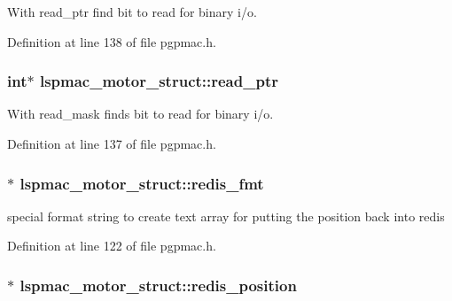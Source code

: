 With read\-\_\-ptr find bit to read for binary i/o. 



Definition at line 138 of file pgpmac.\-h.

\hypertarget{structlspmac__motor__struct_a844b28ccabab5048ca216db074fb9704}{
\subsubsection[{read\-\_\-ptr}]{\setlength{\rightskip}{0pt plus 5cm}int$\ast$ lspmac\-\_\-motor\-\_\-struct\-::read\-\_\-ptr}}\label{structlspmac__motor__struct_a844b28ccabab5048ca216db074fb9704}


With read\-\_\-mask finds bit to read for binary i/o. 



Definition at line 137 of file pgpmac.\-h.

\hypertarget{structlspmac__motor__struct_a91c38b2072d878b71f4e77de2f1375a4}{
\subsubsection[{redis\-\_\-fmt}]{$\ast$ lspmac\-\_\-motor\-\_\-struct\-::redis\-\_\-fmt}}\label{structlspmac__motor__struct_a91c38b2072d878b71f4e77de2f1375a4}


special format string to create text array for putting the position back into redis 



Definition at line 122 of file pgpmac.\-h.

\hypertarget{structlspmac__motor__struct_af94a0b2611136058ead4948fd7c858e3}{
\subsubsection[{redis\-\_\-position}]{$\ast$ lspmac\-\_\-motor\-\_\-struct\-::redis\-\_\-position}}\label{structlspmac__motor__struct_af94a0b2611136058ead4948fd7c858e3}


